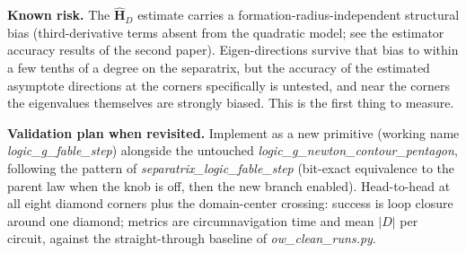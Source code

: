 \textbf{Known risk.} The $\hat{\mathbf{H}}_D$ estimate carries a
formation-radius-independent structural bias (third-derivative terms
absent from the quadratic model; see the estimator accuracy results of
the second paper). Eigen-directions survive that bias to within a few
tenths of a degree on the separatrix, but the accuracy of the estimated
asymptote directions at the corners specifically is untested, and near
the corners the eigenvalues themselves are strongly biased. This is the
first thing to measure.

\textbf{Validation plan when revisited.} Implement as a new primitive
(working name \textit{logic\_g\_fable\_step}) alongside the untouched
\textit{logic\_g\_newton\_contour\_pentagon}, following the pattern of
\textit{separatrix\_logic\_fable\_step} (bit-exact equivalence to the
parent law when the knob is off, then the new branch enabled).
Head-to-head at all eight diamond corners plus the domain-center
crossing: success is loop closure around one diamond; metrics are
circumnavigation time and mean $|D|$ per circuit, against the
straight-through baseline of \textit{ow\_clean\_runs.py}.
